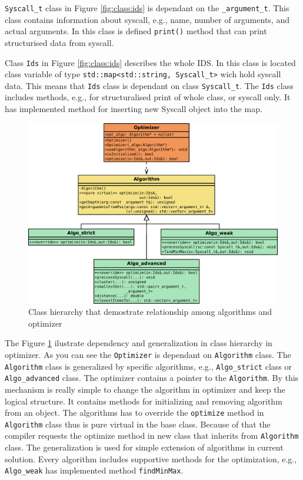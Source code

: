 \texttt{Syscall\_t} class in Figure \ref{fig:class:ids} is dependant  on the
\texttt{\_argument\_t}. This class contains information about syscall, e.g.,
name, number of arguments, and actual arguments. In this class is defined
\texttt{print()} method that can print structurised data from syscall.

Class \texttt{Ids} in Figure \ref{fig:class:ids} describes the whole IDS. In
this class is located class variable of type \texttt{std::map<std::string,
Syscall\_t>} wich hold syscall data. This means that \texttt{Ids} class is
dependant on class \texttt{Syscall\_t}. The \texttt{Ids} class includes methods,
e.g., for structuralised print of whole class, or syscall only. It has
implemented method for inserting new Syscall object into the map.

\begin{figure}[H]
	\centering
	\includegraphics[width=\linewidth]{obrazky-figures/class/algo.pdf}
	\caption{Class hierarchy that demostrate relationship among algorithms and optimizer}
	\label{fig:class:algo}
\end{figure}
\pagebreak

The Figure \ref{fig:class:algo} ilustrate dependency and generalization in class
hierarchy in optimizer. As you can see the \texttt{Optimizer} is dependant on
\texttt{Algorithm} class. The \texttt{Algorithm} class is generalized by
specific algorithms, e.g., \texttt{Algo\_strict} class or
\texttt{Algo\_advanced} class. The optimizer contains a pointer to the
\texttt{Algorithm}. By this mechanism is really simple to change the algorithm
in optimizer and keep the logical structure. It contains methods for
initializing and removing algorithm from an object. The algorithms has to
override the \texttt{optimize} method in \texttt{Algorithm} class thus is pure
virtual in the base class. Because of that the compiler requests the optimize
method in new class that inherits from \texttt{Algorithm} class. The
generalization is used for simple extension of algorithms in current solution.
Every algorithm includes supportive methods for the optimization, e.g.,
\texttt{Algo\_weak} has implemented method \texttt{findMinMax}.

